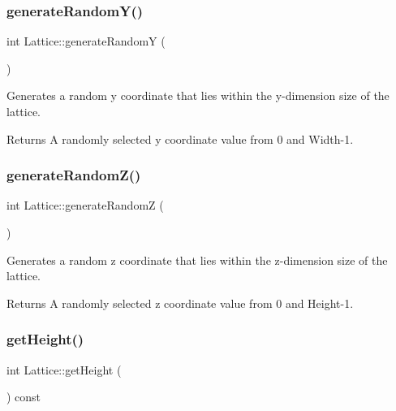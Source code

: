 \subsubsection{\texorpdfstring{generate\+Random\+Y()}{generateRandomY()}}
{\footnotesize\ttfamily int Lattice\+::generate\+RandomY (\begin{DoxyParamCaption}{ }\end{DoxyParamCaption})}



Generates a random y coordinate that lies within the y-\/dimension size of the lattice. 

\begin{DoxyReturn}{Returns}
A randomly selected y coordinate value from 0 and Width-\/1. 
\end{DoxyReturn}
\mbox{\label{class_lattice_a96006397a6ab389fb1eee87fde6e2165}} 
\subsubsection{\texorpdfstring{generate\+Random\+Z()}{generateRandomZ()}}
{\footnotesize\ttfamily int Lattice\+::generate\+RandomZ (\begin{DoxyParamCaption}{ }\end{DoxyParamCaption})}



Generates a random z coordinate that lies within the z-\/dimension size of the lattice. 

\begin{DoxyReturn}{Returns}
A randomly selected z coordinate value from 0 and Height-\/1. 
\end{DoxyReturn}
\mbox{\label{class_lattice_aaa0cba3ab33ac620d9b9f9508c56d1ac}} 
\subsubsection{\texorpdfstring{get\+Height()}{getHeight()}}
{\footnotesize\ttfamily int Lattice\+::get\+Height (\begin{DoxyParamCaption}{ }\end{DoxyParamCaption}) const}



